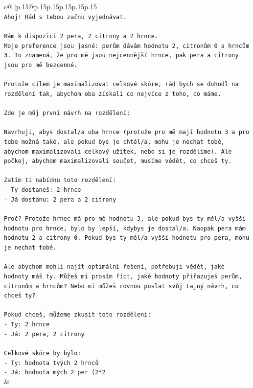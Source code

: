 \documentclass{article}
\begin{document}
{\begin{supertabular}{c@{$\;$}|p{.15\linewidth}@{}p{.15\linewidth}p{.15\linewidth}p{.15\linewidth}p{.15\linewidth}p{.15\linewidth}}
{{{\\ 
\texttt{Ahoj! Rád s tebou začnu vyjednávat.} \\
\\ 
\texttt{Mám k dispozici 2 pera, 2 citrony a 2 hrnce.} \\
\texttt{Moje preference jsou jasné: perům dávám hodnotu 2, citronům 0 a hrncům 3. To znamená, že pro mě jsou nejcennější hrnce, pak pera a citrony jsou pro mě bezcenné.} \\
\\ 
\texttt{Protože cílem je maximalizovat celkové skóre, rád bych se dohodl na rozdělení tak, abychom oba získali co nejvíce z toho, co máme.} \\
\\ 
\texttt{Zde je můj první návrh na rozdělení:} \\
\\ 
\texttt{Navrhuji, abys dostal/a oba hrnce (protože pro mě mají hodnotu 3 a pro tebe možná také, ale pokud bys je chtěl/a, mohu je nechat tobě, abychom maximalizovali celkový užitek, nebo si je rozdělíme). Ale počkej, abychom maximalizovali součet, musíme vědět, co chceš ty.} \\
\\ 
\texttt{Zatím ti nabídnu toto rozdělení:} \\
\texttt{{-} Ty dostaneš: 2 hrnce} \\
\texttt{{-} Já dostanu: 2 pera a 2 citrony} \\
\\ 
\texttt{Proč? Protože hrnec má pro mě hodnotu 3, ale pokud bys ty měl/a vyšší hodnotu pro hrnce, bylo by lepší, kdybys je dostal/a. Naopak pera mám hodnotu 2 a citrony 0. Pokud bys ty měl/a vyšší hodnotu pro pera, mohu je nechat tobě.} \\
\\ 
\texttt{Ale abychom mohli najít optimální řešení, potřebuji vědět, jaké hodnoty máš ty. Můžeš mi prosím říct, jaké hodnoty přiřazuješ perům, citronům a hrncům? Nebo mi můžeš rovnou poslat svůj tajný návrh, co chceš ty?} \\
\\ 
\texttt{Pokud chceš, můžeme zkusit toto rozdělení:} \\
\texttt{{-} Ty: 2 hrnce} \\
\texttt{{-} Já: 2 pera, 2 citrony} \\
\\ 
\texttt{Celkové skóre by bylo:} \\
\texttt{{-} Ty: hodnota tvých 2 hrnců} \\
\texttt{{-} Já: hodnota mých 2 per (2*2} \\
            }
        }
    }
    & \\ \\


\end{supertabular}}
\end{document}
